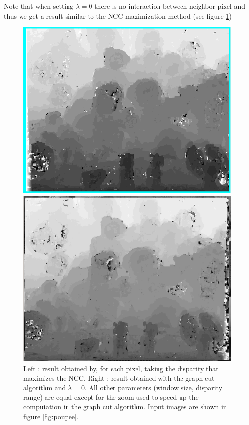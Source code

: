 \documentclass[]{article}
\begin{document}
Note that when setting $\lambda=0$ there is no interaction between neighbor pixel and thus we get a result similar to the NCC maximization method (see figure \ref{fig:lambda0})
\begin{figure}[h]
	\centering
	\begin{minipage}{0.47\linewidth}
		\includegraphics[width=\linewidth]{results/poup_full_monasse.png}
	\end{minipage}\hfill
	\begin{minipage}{0.47\linewidth}
		\includegraphics[width=\linewidth]{results/poup_l0_gc.png}
	\end{minipage}
	\caption{Left : result obtained by, for each pixel, taking the disparity that maximizes the NCC. Right : result obtained with the graph cut algorithm and $\lambda=0$. All other parameters (window size, disparity range) are equal except for the zoom used to speed up the computation in the graph cut algorithm. Input images are shown in figure \ref{fig:poupee}.}
	\label{fig:lambda0}
\end{figure}
\end{document}
